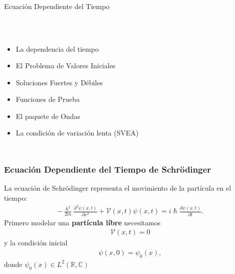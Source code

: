 \documentclass[aspectratio=1610]{beamer}
\newcommand*{\field}[1]{\mathbb{#1}}
\begin{document}
\begin{frame}
\begin{columns}
\column{37em}
\vspace{1cm}
\Huge{\centerline{Ecuación Dependiente del Tiempo}}
\end{columns}
\end{frame}


\begin{frame}
\frametitle{ }
\begin{columns}
\column{37em}
\begin{itemize}\itemsep1em
  \justifying
  \item  \textcolor{Ocean}{La dependencia del tiempo} 
  \item  \textcolor{Ocean}{El Problema de Valores Iniciales} 
  \item  \textcolor{Ocean}{Soluciones Fuertes y Débiles} 
  \item  \textcolor{TextGreen}{Funciones de Prueba}
  \item  \textcolor{TextGreen}{El paquete de Ondas}
  \item  \textcolor{TextGreen}{La condición de variación lenta (SVEA)}
\end{itemize}
\end{columns}
\end{frame}




\begin{frame}
\frametitle{Ecuación Dependiente del Tiempo de Schrödinger}

La ecuación de Schrödinger representa el movimiento de la partícula en el tiempo:
\begin{align}
    -\frac{\hslash^2}{2m}\frac{\partial^2\psi(x,t)}{\partial x^2} + \mathcal{V}(x,t)\psi(x,t) = i\hslash\frac{\partial\psi(x,t)}{\partial t}.
    \label{eq:ECDepTiemp}
\end{align}
Primero modelar una \textbf{partícula líbre} necesitamos 
\begin{align*}
    \mathcal{V}(x,t) = 0
\end{align*}  
y la condición inicial
\begin{align*}
    \psi(x,0) = \psi_{0}(x),
\end{align*}
donde $\psi_{0}(x) \in L^{2}(\field{R},\field{C})$

\begin{columns}
\column{37em}
\end{columns}
\end{frame}
\end{document}
